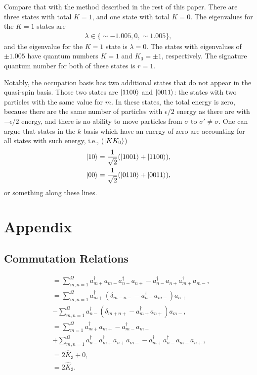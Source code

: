 \documentclass[
a4paper,
10pt,
twoside,
]{article}
\begin{document}
Compare that with the method described in the rest of this paper.
There are three states with total $K = 1$, and one state with total $K = 0$.
The eigenvalues for the $K=1$ states are
\begin{align}
	\lambda \in \{\sim -1.005,0,\sim 1.005\},
\end{align}
and the eigenvalue for the $K=1$ state is $\lambda = 0$.
The states with eigenvalues of $\pm 1.005$ have quantum numbers $K = 1$ and $K_0 = \pm 1$, respectively.
The signature quantum number for both of these states is $r = 1$.

Notably, the occupation basis has two additional states that do not appear in the quasi-spin basis.
Those two states are $\ket{1100}$ and $\ket{0011}$: the states with two particles with the same value for $m$.
In these states, the total energy is zero, because there are the same number of particles with $\epsilon/2$ energy as there are with $-\epsilon/2$ energy, and there is no ability to move particles from $\sigma$ to $\sigma' \neq \sigma$.
One can argue that states in the $k$ basis which have an energy of zero are accounting for all states with such energy, i.e., ($\ket{KK_0}$)
\begin{align}
	\ket{10} &= \frac{1}{\sqrt{2}} (\ket{1001}+\ket{1100}),\\
	\ket{00} &= \frac{1}{\sqrt{2}} (\ket{0110}+\ket{0011}),
\end{align}
or something along these lines.


\section{Appendix}\label{sec: appendix}

\subsection{Commutation Relations} \label{ssec: appendix commutation}


\begin{align}
	[\hat{K}_+,\hat{K}_-]
		&= \sum_{m,n=1}^\Omega a_{m+}^\dagger a_{m-} a_{n-}^\dagger a_{n+} - a_{n-}^\dagger a_{n+} a_{m+}^\dagger a_{m-},\\
		&= \sum_{m,n=1}^\Omega a_{m+}^\dagger (\delta_{m-n-} - a_{n-}^\dagger a_{m-}) a_{n+}\nonumber\\
		&- \sum_{m,n=1}^\Omega a_{n-}^\dagger (\delta_{m+n+} - a_{m+}^\dagger a_{n+}) a_{m-},\\
		&= \sum_{m=1}^\Omega a_{m+}^\dagger a_{m+} - a_{m-}^\dagger a_{m-}\nonumber\\
		&+ \sum_{m,n=1}^\Omega a_{n-}^\dagger a_{m+}^\dagger a_{n+} a_{m-} - a_{m+}^\dagger a_{n-}^\dagger a_{m-} a_{n+},\\
		&= 2\hat{K}_3 + 0,\\
		&= 2\hat{K}_3.
\end{align}
\end{document}
